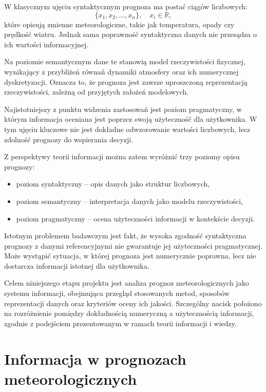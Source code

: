 \documentclass[a4paper,12pt]{article}
\begin{document}
W klasycznym ujęciu syntaktycznym prognoza ma postać ciągów liczbowych:
\[
\{x_1, x_2, \dots, x_n\}, \quad x_i \in \mathbb{R},
\]
które opisują zmienne meteorologiczne, takie jak temperatura, opady czy prędkość wiatru. Jednak sama poprawność syntaktyczna danych nie przesądza o ich wartości informacyjnej.

Na poziomie semantycznym dane te stanowią model rzeczywistości fizycznej, wynikający z przybliżeń równań dynamiki atmosfery oraz ich numerycznej dyskretyzacji. Oznacza to, że prognoza jest zawsze uproszczoną reprezentacją rzeczywistości, zależną od przyjętych założeń modelowych.

Najistotniejszy z punktu widzenia zastosowań jest poziom pragmatyczny, w którym informacja oceniana jest poprzez swoją użyteczność dla użytkownika. W tym ujęciu kluczowe nie jest dokładne odwzorowanie wartości liczbowych, lecz zdolność prognozy do wspierania decyzji.

Z perspektywy teorii informacji można zatem wyróżnić trzy poziomy opisu prognozy:
\begin{itemize}
    \item poziom syntaktyczny -- opis danych jako struktur liczbowych,
    \item poziom semantyczny -- interpretacja danych jako modelu rzeczywistości,
    \item poziom pragmatyczny -- ocena użyteczności informacji w kontekście decyzji.
\end{itemize}

Istotnym problemem badawczym jest fakt, że wysoka zgodność syntaktyczna prognozy z danymi referencyjnymi nie gwarantuje jej użyteczności pragmatycznej. Może wystąpić sytuacja, w której prognoza jest numerycznie poprawna, lecz nie dostarcza informacji istotnej dla użytkownika.

Celem niniejszego etapu projektu jest analiza prognoz meteorologicznych jako systemu informacji, obejmująca przegląd stosowanych metod, sposobów reprezentacji danych oraz kryteriów oceny ich jakości. Szczególny nacisk położono na rozróżnienie pomiędzy dokładnością numeryczną a użytecznością informacji, zgodnie z podejściem prezentowanym w ramach teorii informacji i wiedzy.

\newpage
\section{Informacja w prognozach meteorologicznych}
\end{document}
